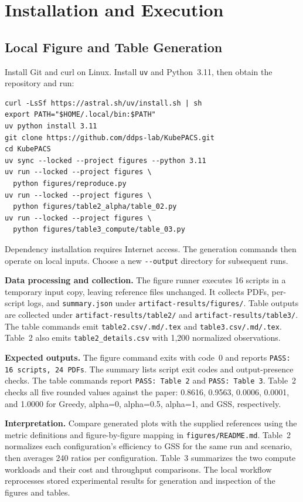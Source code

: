 \documentclass[sigconf,9pt,nonacm,balance=false]{acmart}
\newcommand{\pathcode}[1]{\nolinkurl{#1}}
\begin{document}
\section{Installation and Execution}
\subsection{Local Figure and Table Generation}
Install Git and curl on Linux. Install \texttt{uv} and Python~3.11,
then obtain the repository and run:
\begin{lstlisting}
curl -LsSf https://astral.sh/uv/install.sh | sh
export PATH="$HOME/.local/bin:$PATH"
uv python install 3.11
git clone https://github.com/ddps-lab/KubePACS.git
cd KubePACS
uv sync --locked --project figures --python 3.11
uv run --locked --project figures \
  python figures/reproduce.py
uv run --locked --project figures \
  python figures/table2_alpha/table_02.py
uv run --locked --project figures \
  python figures/table3_compute/table_03.py
\end{lstlisting}
Dependency installation requires Internet access. The generation commands
then operate on local inputs.
Choose a new \texttt{-{}-output} directory for subsequent runs.

\textbf{Data processing and collection.}
The figure runner executes 16 scripts in a temporary input copy, leaving
reference files unchanged. It collects PDFs, per-script logs, and
\pathcode{summary.json} under \pathcode{artifact-results/figures/}.
Table outputs are collected under \pathcode{artifact-results/table2/} and
\pathcode{artifact-results/table3/}. The table commands emit
\pathcode{table2.csv/.md/.tex} and \pathcode{table3.csv/.md/.tex}. Table~2 also
emits \pathcode{table2_details.csv} with 1,200 normalized observations.

\textbf{Expected outputs.}
The figure command exits with code~0 and reports
\texttt{PASS: 16 scripts, 24 PDFs}. The summary lists script exit codes and
output-presence checks. The table commands report \texttt{PASS: Table 2}
and \texttt{PASS: Table 3}. Table~2 checks all five rounded values against the
paper: 0.8616, 0.9563, 0.0006, 0.0001, and 1.0000 for Greedy, alpha=0,
alpha=0.5, alpha=1, and GSS, respectively.

\textbf{Interpretation.}
Compare generated plots with the supplied references using the metric
definitions and figure-by-figure mapping in \pathcode{figures/README.md}.
Table~2 normalizes each configuration's efficiency to GSS for the same run
and scenario, then averages 240 ratios per configuration. Table~3 summarizes
the two compute workloads and their cost and throughput comparisons.
The local workflow reprocesses stored experimental results for generation
and inspection of the figures and tables.
\end{document}
